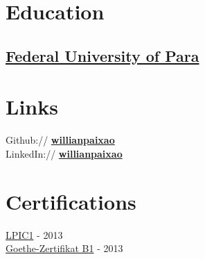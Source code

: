 \documentclass[]{willianpaixao-resume}
\begin{document}
\lastupdated



\begin{minipage}[t]{0.34\textwidth}


\section{Education}

\subsection{\href{http://www.portal.ufpa.br/}{Federal University of Para}}
\sectionsep


\section{Links} 
Github:// \href{https://github.com/willianpaixao}{\bf willianpaixao} \\
LinkedIn://  \href{https://www.linkedin.com/in/willianpaixao}{\bf willianpaixao} \\
\sectionsep


\section{Certifications}
\href{https://www.lpi.org/certification/get-certified-lpi/lpic-1-linux-server-professional/}{LPIC1} - 2013 \\
\href{https://www.goethe.de/en/spr/kup/prf/prf/gb1.html}{Goethe-Zertifikat B1} - 2013
\sectionsep


\end{minipage}
\end{document}
